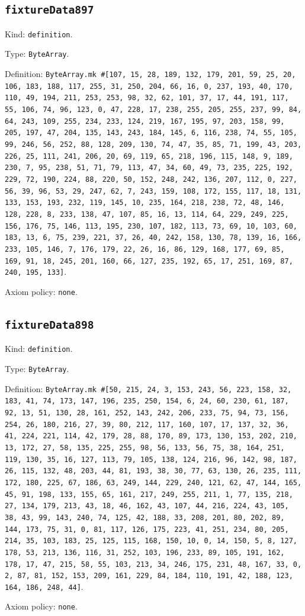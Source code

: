 \documentclass[11pt]{article}
\begin{document}
\subsection*{\texttt{fixtureData897}}
\noindent Kind: \texttt{definition}.\par
\noindent Type: \texttt{ByteArray}.\par
\noindent Definition: \texttt{ByteArray.mk \#[107, 15, 28, 189, 132, 179, 201, 59, 25, 20, 106, 183, 188, 117, 255, 31, 250, 204, 66, 16, 0, 237, 193, 40, 170, 110, 49, 194, 211, 253, 253, 98, 32, 62, 101, 37, 17, 44, 191, 117, 55, 106, 74, 96, 123, 0, 47, 228, 17, 238, 255, 205, 255, 237, 99, 84, 64, 243, 109, 255, 234, 233, 124, 219, 167, 195, 97, 203, 158, 99, 205, 197, 47, 204, 135, 143, 243, 184, 145, 6, 116, 238, 74, 55, 105, 99, 246, 56, 252, 88, 128, 209, 130, 74, 47, 35, 85, 71, 199, 43, 203, 226, 25, 111, 241, 206, 20, 69, 119, 65, 218, 196, 115, 148, 9, 189, 230, 7, 95, 238, 51, 71, 79, 113, 47, 34, 60, 49, 73, 235, 225, 192, 229, 72, 190, 224, 88, 220, 50, 152, 248, 242, 136, 207, 112, 0, 227, 56, 39, 96, 53, 29, 247, 62, 7, 243, 159, 108, 172, 155, 117, 18, 131, 133, 153, 193, 232, 119, 145, 10, 235, 164, 218, 238, 72, 48, 146, 128, 228, 8, 233, 138, 47, 107, 85, 16, 13, 114, 64, 229, 249, 225, 156, 176, 75, 146, 113, 195, 230, 107, 182, 113, 73, 69, 10, 103, 60, 183, 13, 6, 75, 239, 221, 37, 26, 40, 242, 158, 130, 78, 139, 16, 166, 233, 105, 146, 7, 176, 179, 22, 26, 16, 86, 129, 168, 177, 69, 85, 169, 91, 18, 245, 201, 160, 66, 127, 235, 192, 65, 17, 251, 169, 87, 240, 195, 133]}.\par
\noindent Axiom policy: \texttt{none}.\par
\subsection*{\texttt{fixtureData898}}
\noindent Kind: \texttt{definition}.\par
\noindent Type: \texttt{ByteArray}.\par
\noindent Definition: \texttt{ByteArray.mk \#[50, 215, 24, 3, 153, 243, 56, 223, 158, 32, 183, 41, 74, 173, 147, 196, 235, 250, 154, 6, 24, 60, 230, 61, 187, 92, 13, 51, 130, 28, 161, 252, 143, 242, 206, 233, 75, 94, 73, 156, 254, 26, 180, 216, 27, 39, 80, 212, 117, 160, 107, 17, 137, 32, 36, 41, 224, 221, 114, 42, 179, 28, 88, 170, 89, 173, 130, 153, 202, 210, 13, 172, 27, 58, 135, 225, 255, 98, 56, 133, 56, 75, 38, 164, 251, 119, 130, 35, 16, 127, 113, 79, 105, 138, 124, 216, 96, 142, 98, 187, 26, 115, 132, 48, 203, 44, 81, 193, 38, 30, 77, 63, 130, 26, 235, 111, 172, 180, 225, 67, 186, 63, 249, 144, 229, 240, 121, 62, 47, 144, 165, 45, 91, 198, 133, 155, 65, 161, 217, 249, 255, 211, 1, 77, 135, 218, 27, 134, 179, 213, 43, 18, 46, 162, 43, 107, 44, 216, 224, 43, 105, 38, 43, 99, 143, 240, 74, 125, 42, 188, 33, 208, 201, 80, 202, 89, 144, 173, 75, 31, 0, 81, 117, 126, 175, 223, 41, 251, 234, 80, 205, 214, 35, 103, 183, 25, 125, 115, 168, 150, 10, 0, 14, 150, 5, 8, 127, 178, 53, 213, 136, 116, 31, 252, 103, 196, 233, 89, 105, 191, 162, 178, 17, 47, 215, 58, 55, 103, 213, 34, 246, 175, 231, 48, 167, 33, 0, 2, 87, 81, 152, 153, 209, 161, 229, 84, 184, 110, 191, 42, 188, 123, 164, 186, 248, 44]}.\par
\noindent Axiom policy: \texttt{none}.\par
\end{document}
